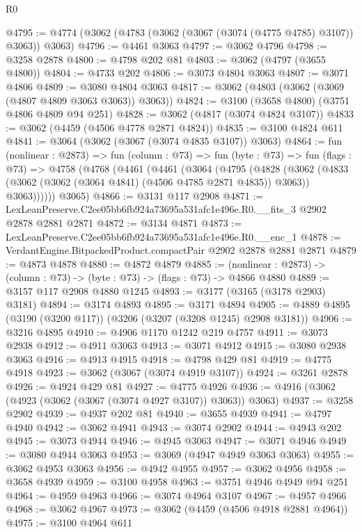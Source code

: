 \begin{lexlean}{R0}
\begin{coremodule}
@4795 := @4774 (@3062 (@4783 (@3062 (@3067 (@3074 (@4775 @4785) @3107)) @3063)) @3063)
@4796 := @4461 @3063
@4797 := @3062 @4796
@4798 := @3258 @2878
@4800 := @4798 @202 @81
@4803 := @3062 (@4797 (@3655 @4800))
@4804 := @4733 @202
@4806 := @3073 @4804 @3063
@4807 := @3071 @4806
@4809 := @3080 @4804 @3063
@4817 := @3062 (@4803 (@3062 (@3069 (@4807 @4809 @3063 @3063)) @3063))
@4824 := @3100 (@3658 @4800) (@3751 @4806 @4809 @94 @251)
@4828 := @3062 (@4817 (@3074 @4824 @3107))
@4833 := @3062 (@4459 (@4506 @4778 @2871 @4824))
@4835 := @3100 @4824 @611
@4841 := @3064 (@3062 (@3067 (@3074 @4835 @3107)) @3063)
@4864 := fun (nonlinear : @2873) =>
  fun (column : @73) =>
  fun (byte : @73) =>
  fun (flags : @73) =>
  @4758
    (@4768
      (@4461
        (@4461
          (@3064
            (@4795
              (@4828
                (@3062
                  (@4833 (@3062 (@3062 (@3064 @4841) (@4506 @4785 @2871 @4835)) @3063))
                  @3063))))))
      @3065)
@4866 := @3131 @117 @2908
@4871 := LexLeanPreserve.C2ee05bb6fb924a73695a531afc1e496e.R0.__fits_3 @2902 @2878 @2881 @2871
@4872 := @3134 @4871
@4873 := LexLeanPreserve.C2ee05bb6fb924a73695a531afc1e496e.R0.__enc_1
@4878 := VerdantEngine.BitpackedProduct.compactPair @2902 @2878 @2881 @2871
@4879 := @4873 @4878
@4880 := @4872 @4879
@4885 := (nonlinear : @2873) -> (column : @73) -> (byte : @73) -> (flags : @73) -> @4866 @4880
@4889 := @3157 @117 @2908 @4880 @1245
@4893 := @3177 (@3165 (@3178 @2903) @3181)
@4894 := @3174 @4893
@4895 := @3171 @4894
@4905 := @4889 @4895 (@3190 (@3200 @117)) (@3206 (@3207 (@3208 @1245) @2908 @3181))
@4906 := @3216 @4895
@4910 := @4906 @1170 @1242 @219 @4757
@4911 := @3073 @2938
@4912 := @4911 @3063
@4913 := @3071 @4912
@4915 := @3080 @2938 @3063
@4916 := @4913 @4915
@4918 := @4798 @429 @81
@4919 := @4775 @4918
@4923 := @3062 (@3067 (@3074 @4919 @3107))
@4924 := @3261 @2878
@4926 := @4924 @429 @81
@4927 := @4775 @4926
@4936 := @4916 (@3062 (@4923 (@3062 (@3067 (@3074 @4927 @3107)) @3063)) @3063)
@4937 := @3258 @2902
@4939 := @4937 @202 @81
@4940 := @3655 @4939
@4941 := @4797 @4940
@4942 := @3062 @4941
@4943 := @3074 @2902
@4944 := @4943 @202
@4945 := @3073 @4944
@4946 := @4945 @3063
@4947 := @3071 @4946
@4949 := @3080 @4944 @3063
@4953 := @3069 (@4947 @4949 @3063 @3063)
@4955 := @3062 @4953 @3063
@4956 := @4942 @4955
@4957 := @3062 @4956
@4958 := @3658 @4939
@4959 := @3100 @4958
@4963 := @3751 @4946 @4949 @94 @251
@4964 := @4959 @4963
@4966 := @3074 @4964 @3107
@4967 := @4957 @4966
@4968 := @3062 @4967
@4973 := @3062 (@4459 (@4506 @4918 @2881 @4964))
@4975 := @3100 @4964 @611

\end{coremodule}
\end{lexlean}
